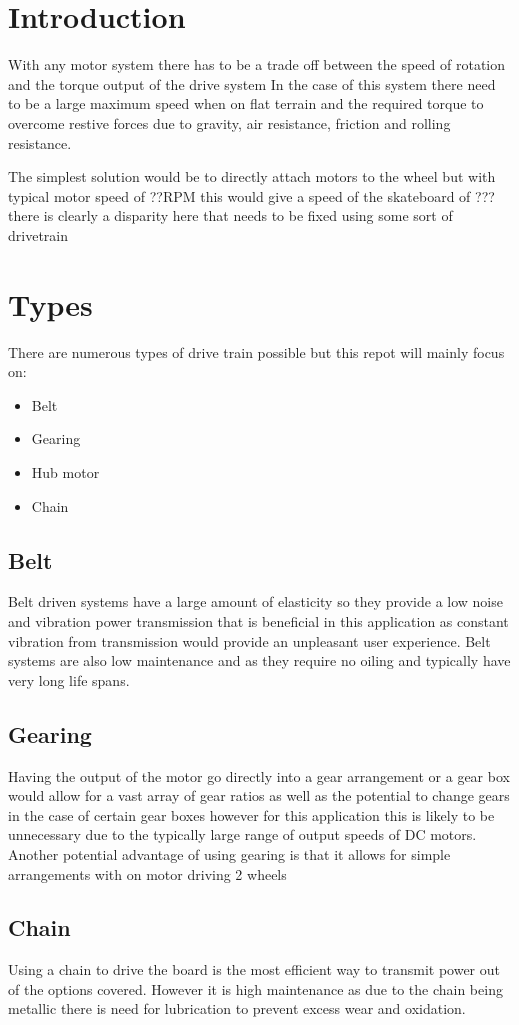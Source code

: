 \documentclass{article}
\begin{document}
\section{Introduction}
With any motor system there has to be a trade off between the speed of rotation and the torque output of the drive system In the case of this system there need to be a large maximum speed when on flat terrain and the required torque to overcome restive forces due to gravity, air resistance, friction and rolling resistance.

The simplest solution would be to directly attach motors to the wheel but with typical motor speed of ??RPM this would give a speed of the skateboard of ??? there is clearly a disparity here that needs to be fixed using some sort of drivetrain

\section{Types}
There are numerous types of drive train possible but this repot will mainly focus on:
\begin{itemize}
	\item Belt
	\item Gearing
	\item Hub motor
	\item Chain
\end{itemize}
\subsection{Belt}
Belt driven systems have a large amount of elasticity so they provide a low noise and vibration power transmission that is beneficial in this application as constant vibration from transmission would provide an unpleasant user experience.
Belt systems are also low maintenance and as they require no oiling and typically have very long life spans.
\subsection{Gearing}
Having the output of the motor go directly into a gear arrangement or a gear box would allow for a vast array of gear ratios as well as the potential to change gears in the case of certain gear boxes however for this application this is likely to be unnecessary due to the typically large range of output speeds of DC motors. Another potential advantage of using gearing is that it allows for simple arrangements with on motor driving 2 wheels
\subsection{Chain}
Using a chain to drive the board is the most efficient way to transmit power out of the options covered. 
However it is high maintenance as due to the chain being metallic there is need for lubrication to prevent excess wear and oxidation. 
\end{document}
